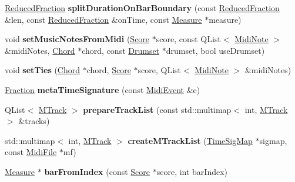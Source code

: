 \begin{DoxyCompactItemize}
\hyperlink{class_ms_1_1_reduced_fraction}{Reduced\+Fraction} {\bfseries split\+Duration\+On\+Bar\+Boundary} (const \hyperlink{class_ms_1_1_reduced_fraction}{Reduced\+Fraction} \&len, const \hyperlink{class_ms_1_1_reduced_fraction}{Reduced\+Fraction} \&on\+Time, const \hyperlink{class_ms_1_1_measure}{Measure} $\ast$measure)
\item 
\mbox{\label{namespace_ms_a12058955d789f368d3975e7c989fc7e1}} 
void {\bfseries set\+Music\+Notes\+From\+Midi} (\hyperlink{class_ms_1_1_score}{Score} $\ast$score, const Q\+List$<$ \hyperlink{class_ms_1_1_midi_note}{Midi\+Note} $>$ \&midi\+Notes, \hyperlink{class_ms_1_1_chord}{Chord} $\ast$chord, const \hyperlink{class_ms_1_1_drumset}{Drumset} $\ast$drumset, bool use\+Drumset)
\item 
\mbox{\label{namespace_ms_a2a6b4472bab4fcdfcbd9a56bc2cf4861}} 
void {\bfseries set\+Ties} (\hyperlink{class_ms_1_1_chord}{Chord} $\ast$chord, \hyperlink{class_ms_1_1_score}{Score} $\ast$score, Q\+List$<$ \hyperlink{class_ms_1_1_midi_note}{Midi\+Note} $>$ \&midi\+Notes)
\item 
\mbox{\label{namespace_ms_af66a60977406a737d7d8b6b3b1020dc1}} 
\hyperlink{class_ms_1_1_fraction}{Fraction} {\bfseries meta\+Time\+Signature} (const \hyperlink{class_ms_1_1_midi_event}{Midi\+Event} \&e)
\item 
\mbox{\label{namespace_ms_a8263c212fa8b08872a685ed26f45a9a8}} 
Q\+List$<$ \hyperlink{class_ms_1_1_m_track}{M\+Track} $>$ {\bfseries prepare\+Track\+List} (const std\+::multimap$<$ int, \hyperlink{class_ms_1_1_m_track}{M\+Track} $>$ \&tracks)
\item 
\mbox{\label{namespace_ms_ab5901b2b5d155b820a4b98be127981a8}} 
std\+::multimap$<$ int, \hyperlink{class_ms_1_1_m_track}{M\+Track} $>$ {\bfseries create\+M\+Track\+List} (\hyperlink{class_ms_1_1_time_sig_map}{Time\+Sig\+Map} $\ast$sigmap, const \hyperlink{class_ms_1_1_midi_file}{Midi\+File} $\ast$mf)
\item 
\mbox{\label{namespace_ms_a1c9a3ae3a4fadf8670121c32e2b85c89}} 
\hyperlink{class_ms_1_1_measure}{Measure} $\ast$ {\bfseries bar\+From\+Index} (const \hyperlink{class_ms_1_1_score}{Score} $\ast$score, int bar\+Index)
\item 

\end{DoxyCompactItemize}
